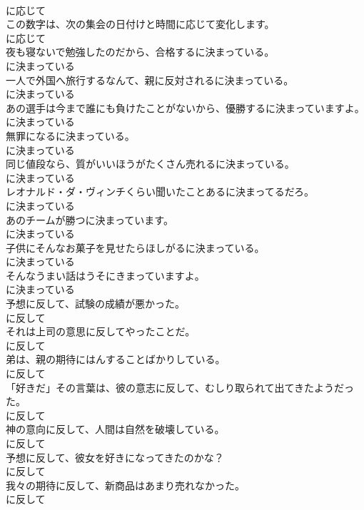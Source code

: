 \documentclass[8pt]{extreport}
\begin{document}
\begin{CJK}{UTF8}{min}
\\	に応じて	
\\	この数字は、次の集会の日付けと時間に応じて変化します。	
\\	に応じて	
\\	夜も寝ないで勉強したのだから、合格するに決まっている。	
\\	に決まっている	
\\	一人で外国へ旅行するなんて、親に反対されるに決まっている。	
\\	に決まっている	
\\	あの選手は今まで誰にも負けたことがないから、優勝するに決まっていますよ。	
\\	に決まっている	
\\	無罪になるに決まっている。	
\\	に決まっている	
\\	同じ値段なら、質がいいほうがたくさん売れるに決まっている。	
\\	に決まっている	
\\	レオナルド・ダ・ヴィンチくらい聞いたことあるに決まってるだろ。	
\\	に決まっている	
\\	あのチームが勝つに決まっています。	
\\	に決まっている	
\\	子供にそんなお菓子を見せたらほしがるに決まっている。	
\\	に決まっている	
\\	そんなうまい話はうそにきまっていますよ。	
\\	に決まっている	
\\	予想に反して、試験の成績が悪かった。	
\\	に反して	
\\	それは上司の意思に反してやったことだ。	
\\	に反して	
\\	弟は、親の期待にはんすることばかりしている。	
\\	に反して	
\\	「好きだ」その言葉は、彼の意志に反して、むしり取られて出てきたようだった。	
\\	に反して	
\\	神の意向に反して、人間は自然を破壊している。	
\\	に反して	
\\	予想に反して、彼女を好きになってきたのかな？	
\\	に反して	
\\	我々の期待に反して、新商品はあまり売れなかった。	
\\	に反して	

\end{CJK}
\end{document}
